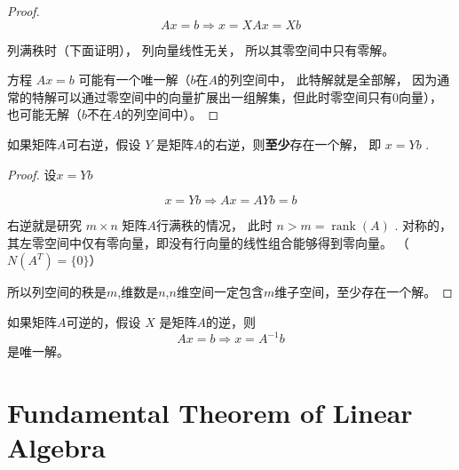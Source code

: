 \begin{proof}
    \begin{equation}
A x=b \Rightarrow  x=X A x=X b
\end{equation}

    列满秩时（下面证明）， 列向量线性无关， 所以其零空间中只有零解。
    
    方程 $ {Ax}={b} $ 可能有一个唯一解（$b$在$A$的列空间中， 此特解就是全部解， 因为通常的特解可以通过零空间中的向量扩展出一组解集，但此时零空间只有$0$向量）， 也可能无解（$b$不在$A$的列空间中）。

    
\end{proof}

\begin{theorem}
    如果矩阵$A$可右逆，假设 $ Y $ 是矩阵$A$的右逆，则\textbf{至少}存在一个解， 即 $ x= {Y} b $ . 
\end{theorem}

\begin{proof}
    设$x=Y b$ 

    \begin{equation}
x=Y b  \Rightarrow  A x=A Y b=b
\end{equation}


右逆就是研究 $m \times n $ 矩阵$A$行满秩的情况， 此时 $  {n}> {m}=\operatorname{rank}( {A}) $ . 对称的， 其左零空间中仅有零向量，即没有行向量的线性组合能够得到零向量。 （$N(A ^T ) = \{0\}$）

所以列空间的秩是$m$,维数是$n$,$n$维空间一定包含$m$维子空间，至少存在一个解。
\end{proof}

\begin{theorem}
    如果矩阵$A$可逆的，假设 $ X $ 是矩阵$A$的逆，则
\begin{equation}
A x=b  \Rightarrow  x=A^{-1} b
\end{equation}
是唯一解。 
\end{theorem}

\section{Fundamental Theorem of Linear Algebra}

